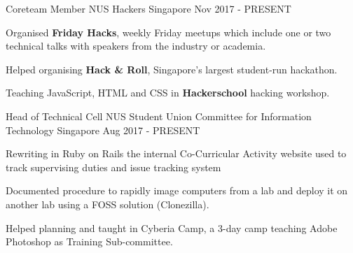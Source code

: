 

\begin{cventries}

 \cventry
    {Coreteam Member} %
    {NUS Hackers} %
    {Singapore} %
    {Nov 2017 - PRESENT} %
    {
      \begin{cvitems} %
      	\item {Organised \textbf{Friday Hacks}, weekly Friday meetups which include one or two technical talks with speakers from the industry or academia.}
      	\item {Helped organising \textbf{Hack \& Roll}, Singapore's largest student-run hackathon.}
      	\item {Teaching JavaScript, HTML and CSS in \textbf{Hackerschool} hacking workshop.}
      \end{cvitems}
    }
    
  \cventry
    {Head of Technical Cell} %
    {NUS Student Union Committee for Information Technology} %
    {Singapore} %
    {Aug 2017 - PRESENT} %
    {
      \begin{cvitems} %
	    \item {Rewriting in Ruby on Rails the internal Co-Curricular Activity website used to track supervising duties and issue tracking system}
      	\item {Documented procedure to rapidly image computers from a lab and deploy it on another lab using a FOSS solution (Clonezilla).}
        \item {Helped planning and taught in Cyberia Camp, a 3-day camp teaching Adobe Photoshop as Training Sub-committee.}
      \end{cvitems}
    }
    
\end{cventries}
